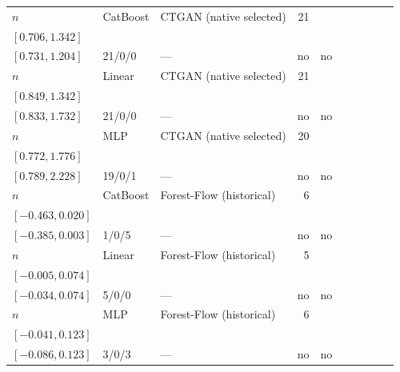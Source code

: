 \begin{longtable}{@{}ll>{\raggedright\arraybackslash}p{1.1in}rllrlll@{}}
$n$ & CatBoost & CTGAN (native selected) & 21 & \begin{tabular}[t]{@{}l@{}}$0.785$\\\tiny$[0.706, 1.342]$\end{tabular} & \begin{tabular}[t]{@{}l@{}}$0.880$\\\tiny$[0.731, 1.204]$\end{tabular} & 21/0/0 & --- & no & no \\
$n$ & Linear & CTGAN (native selected) & 21 & \begin{tabular}[t]{@{}l@{}}$1.052$\\\tiny$[0.849, 1.342]$\end{tabular} & \begin{tabular}[t]{@{}l@{}}$1.104$\\\tiny$[0.833, 1.732]$\end{tabular} & 21/0/0 & --- & no & no \\
$n$ & MLP & CTGAN (native selected) & 20 & \begin{tabular}[t]{@{}l@{}}$1.135$\\\tiny$[0.772, 1.776]$\end{tabular} & \begin{tabular}[t]{@{}l@{}}$1.295$\\\tiny$[0.789, 2.228]$\end{tabular} & 19/0/1 & --- & no & no \\
$n$ & CatBoost & Forest-Flow (historical) & 6 & \begin{tabular}[t]{@{}l@{}}$-0.045$\\\tiny$[-0.463, 0.020]$\end{tabular} & \begin{tabular}[t]{@{}l@{}}$-0.206$\\\tiny$[-0.385, 0.003]$\end{tabular} & 1/0/5 & --- & no & no \\
$n$ & Linear & Forest-Flow (historical) & 5 & \begin{tabular}[t]{@{}l@{}}$0.024$\\\tiny$[-0.005, 0.074]$\end{tabular} & \begin{tabular}[t]{@{}l@{}}$0.037$\\\tiny$[-0.034, 0.074]$\end{tabular} & 5/0/0 & --- & no & no \\
$n$ & MLP & Forest-Flow (historical) & 6 & \begin{tabular}[t]{@{}l@{}}$0.005$\\\tiny$[-0.041, 0.123]$\end{tabular} & \begin{tabular}[t]{@{}l@{}}$0.010$\\\tiny$[-0.086, 0.123]$\end{tabular} & 3/0/3 & --- & no & no \\

\end{longtable}
